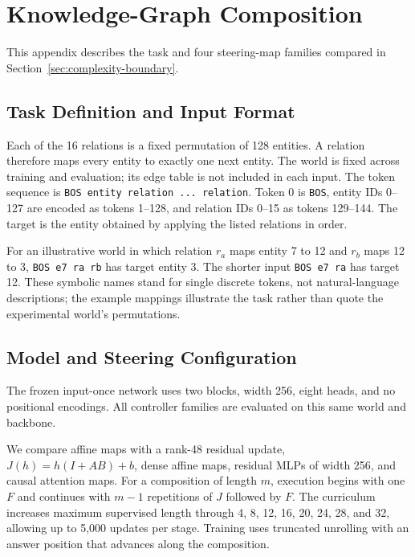 \documentclass{article}
\begin{document}
\section{Knowledge-Graph Composition}
\label{app:cross-task}
This appendix describes the task and four steering-map families compared in Section~\ref{sec:complexity-boundary}.

\subsection{Task Definition and Input Format}
Each of the 16 relations is a fixed permutation of 128 entities. A relation therefore maps every entity to exactly one next entity. The world is fixed across training and evaluation; its edge table is not included in each input. The token sequence is \texttt{BOS entity relation ... relation}. Token 0 is \texttt{BOS}, entity IDs 0--127 are encoded as tokens 1--128, and relation IDs 0--15 as tokens 129--144. The target is the entity obtained by applying the listed relations in order.

For an illustrative world in which relation $r_a$ maps entity 7 to 12 and $r_b$ maps 12 to 3, \texttt{BOS e7 ra rb} has target entity 3. The shorter input \texttt{BOS e7 ra} has target 12. These symbolic names stand for single discrete tokens, not natural-language descriptions; the example mappings illustrate the task rather than quote the experimental world's permutations.

\subsection{Model and Steering Configuration}
The frozen input-once network uses two blocks, width 256, eight heads, and no positional encodings. All controller families are evaluated on this same world and backbone.

We compare affine maps with a rank-48 residual update, $J(h)=h(I+AB)+b$, dense affine maps, residual MLPs of width 256, and causal attention maps. For a composition of length $m$, execution begins with one $F$ and continues with $m-1$ repetitions of $J$ followed by $F$. The curriculum increases maximum supervised length through 4, 8, 12, 16, 20, 24, 28, and 32, allowing up to 5,000 updates per stage. Training uses truncated unrolling with an answer position that advances along the composition.
\end{document}
